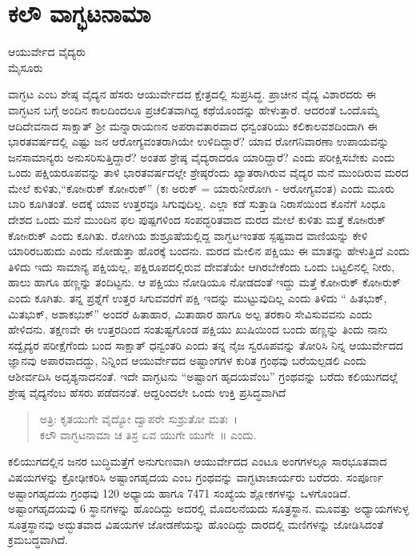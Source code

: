 {\fontsize{14}{16}\selectfont
{}
\chapter{ಕಲೌ ವಾಗ್ಭಟನಾಮಾ} 

\begin{center}
\smallskip

ಆಯುರ್ವೇದ ವೈದ್ಯರು\\
ಮೈಸೂರು
\addrule
\end{center}

ವಾಗ್ಭಟ ಎಂಬ ಶೇಷ್ಠ ವೈದ್ಯನ ಹೆಸರು ಆಯುರ್ವೇದದ ಕ್ಷೇತ್ರದಲ್ಲಿ ಸುಪ್ರಸಿದ್ಧ. ಪ್ರಾಚೀನ ವೈದ್ಯ ವಿಶಾರದರು ಈ ವಾಗ್ಭಟನ ಬಗ್ಗೆ ಅಂದಿನ ಕಾಲದಿಂದಲೂ ಪ್ರಚಲಿತವಾಗಿದ್ದ ಕಥೆಯೊಂದನ್ನು ಹೇಳುತ್ತಾರೆ. ಆದರಂತೆ ಒಂದೊಮ್ಮೆ ಆದಿದೇವನಾದ  ಸಾಕ್ಷಾತ್ ಶ್ರೀ ಮನ್ನಾರಾಯಣನ ಅಪರಾವತಾರವಾದ ಧನ್ವಂತರಿಯು ಕಲಿಕಾಲವಶದಿಂದಾಗಿ ಈ ಭಾರತವರ್ಷದಲ್ಲಿ ಎಷ್ಟು ಜನ ಆರೋಗ್ಯವಂತರಾಗಿಯೇ ಉಳಿದಿದ್ದಾರೆ? ಯಾವ ರೋಗನಿವಾರಣಾ ಉಪಾಯವನ್ನು ಜನಸಾಮಾನ್ಯರು ಅನುಸರಿಸುತ್ತಿದ್ದಾರೆ? ಅಂತಹ ಶ್ರೇಷ್ಠ ವೈದ್ಯರಾದರೂ ಯಾರಿದ್ದಾರೆ? ಎಂದು ಪರೀಕ್ಷಿಸಬೇಕು ಎಂದು ಒಂದು ಪಕ್ಷಿಯರೂಪವನ್ನು ತಾಳಿ ಭಾರತವರ್ಷದಲ್ಲೇ ಶ್ರೇಷ್ಠರೆಂದು ಖ್ಯಾತರಾಗಿರುವ ವೈದ್ಯರ ಮನೆ ಮುಂದಿರುವ ಮರದ ಮೇಲೆ ಕುಳಿತು,“ಕೋsರುಕ್ ಕೋsರುಕ್” (ಕಃ ಅರುಕ್ = ಯಾರು\break ನೀರೋಗಿ - ಆರೋಗ್ಯವಂತ) ಎಂದು ಮೂರು ಬಾರಿ ಕೂಗಿತಂತೆ. ಅದಕ್ಕೆ ಯಾವ ಉತ್ತರವೂ ಸಿಗುವುದಿಲ್ಲ. ಎಲ್ಲಾ ಕಡೆ ಸುತ್ತಾಡಿ ನಿರಾಸೆಯಿಂದ ಕೊನೆಗೆ ಸಿಂಧೂ ದೇಶದ ಒಂದು ಮನೆ ಮುಂದಿನ ಫಲ ಪುಷ್ಪಗಳಿಂದ ಸಂಪದ್ಭರಿತವಾದ ಮರದ ಮೇಲೆ ಕುಳಿತು ಮತ್ತೆ ಕೋsರುಕ್ ಕೋsರುಕ್ ಎಂದು ಕೂಗಿತು. ರೋಗಿಯ ಶುಶ್ರೂಷೆಯಲ್ಲಿದ್ದ ವಾಗ್ಭಟ\break ಇಂತಹ ಸ್ಪಷ್ಟವಾದ ವಾಣಿಯನ್ನು ಕೇಳಿ ಯಾರಿರಬಹುದು ಎಂದು ನೋಡುತ್ತಾ ಹೊರಕ್ಕೆ ಬಂದನು. ಮರದ ಮೇಲಿನ ಪಕ್ಷಿಯು ಈ ಮಾತನ್ನು ಹೇಳುತ್ತಿದೆ ಎಂದು ತಿಳಿದು ಇದು ಸಾಮಾನ್ಯ ಪಕ್ಷಿಯಲ್ಲ, ಪಕ್ಷಿರೂಪದಲ್ಲಿರುವ ದೇವತೆಯೇ ಆಗಿರಬೇಕೆಂದು ಒಂದು ಬಟ್ಟಲಿನಲ್ಲಿ ನೀರು, ಹಾಲು ಹಾಗೂ ಹಣ್ಣನ್ನು ತಂದಿಟ್ಟನು. ಆ ಪಕ್ಷಿಯು ನೋಡಿಯೂ ನೋಡದಂತೆ ಇದ್ದು ಮತ್ತೆ ಕೋsರುಕ್ ಕೋsರುಕ್ ಎಂದು ಕೂಗಿತು. ತನ್ನ ಪ್ರಶ್ನೆಗೆ ಉತ್ತರ ಸಿಗುವವರೆಗೆ ಪಕ್ಷಿ ಇದನ್ನು ಮುಟ್ಟುವುದಿಲ್ಲ ಎಂದು ತಿಳಿದು “ ಹಿತಭುಕ್, ಮಿತಭುಕ್, ಅಶಾಕಭುಕ್” ಅಂದರೆ ಹಿತಾಹಾರ, ಮಿತಾಹಾರ ಹಾಗೂ ಅಲ್ಪ ತರಕಾರಿ ಸೇವಿಸುವವನು ಎಂದು ಹೇಳಿದನು. ತಕ್ಷಣವೇ ಈ ಉತ್ತರದಿಂದ ಸಂತುಷ್ಟಗೊಂಡ ಪಕ್ಷಿಯು ಖುಷಿಯಿಂದ ಬಂದು ಹಣ್ಣನ್ನು ತಿಂದು ನಾನು ಸದ್ವೈದ್ಯರ ಪರೀಕ್ಷೆಗೆಂದು ಬಂದ ಸಾಕ್ಷಾತ್ ಧನ್ವಂತರಿ ಎಂದು ತನ್ನ ನೈಜ ಸ್ವರೂಪವನ್ನು ತೋರಿಸಿ ನಿನ್ನ ಆಯುರ್ವೇದದ ಜ್ಞಾನವು ಅಪಾರವಾದದ್ದು, ನಿನ್ನಿಂದ ಆಯುರ್ವೇದದ ಅಷ್ಟಾಂಗಗಳ ಕುರಿತ ಗ್ರಂಥವು ಬರೆಯಲ್ಪಡಲಿ ಎಂದು ಆಶೀರ್ವದಿಸಿ ಅದೃಶ್ಯನಾದನಂತೆ. ಇದೇ ವಾಗ್ಭಟನು “ಅಷ್ಟಾಂಗ ಹೃದಯವೆಂಬ” ಗ್ರಂಥವನ್ನು ಬರೆದು ಕಲಿಯುಗದಲ್ಲೆ ಶ್ರೇಷ್ಠ ವೈದ್ಯನೆಂಬ ಹೆಸರು ಪಡೆದನಂತೆ. ಆದ್ದರಿಂದಲೇ ಒಂದು ಉಕ್ತಿ ಪ್ರಸಿದ್ಧವಾಗಿದೆ 
\begin{verse}
ಅತ್ರಿ: ಕೃತಯುಗೇ ವೈದ್ಯೋ ದ್ವಾಪರೇ ಸುಶ್ರುತೋ ಮತಃ~। \\
ಕಲೌ ವಾಗ್ಭಟನಾಮಾ ಚ ತಿಸ್ರ ಏವ ಯುಗೇ ಯುಗೇ~॥ ಎಂದು.
\end{verse}
ಕಲಿಯುಗದಲ್ಲಿನ ಜನರ ಬುದ್ಧಿಮತ್ತೆಗೆ ಅನುಗುಣವಾಗಿ ಆಯುರ್ವೇದದ ಎಂಟೂ ಅಂಗಗಳಲ್ಲೂ ಸಾರಭೂತವಾದ ವಿಷಯಗಳನ್ನು ಕ್ರೋಢೀಕರಿಸಿ ಅಷ್ಟಾಂಗಹೃದಯ ಎಂಬ ಗ್ರಂಥವನ್ನು ವಾಗ್ಭಟಾಚಾರ್ಯರು ಬರೆದರು. ಸಂಪೂರ್ಣ ಅಷ್ಟಾಂಗ\-ಹೃದಯ ಗ್ರಂಥವು 120 ಅಧ್ಯಾಯ ಹಾಗೂ 7471 ಸಂಖ್ಯೆಯ ಶ್ಲೋಕಗಳನ್ನು ಒಳ\-ಗೊಂಡಿದೆ. ಅಷ್ಟಾಂಗಹೃದಯವು 6 ಸ್ಥಾನಗಳನ್ನು ಹೊಂದಿದ್ದು ಅದರಲ್ಲಿ ಮೊದಲನೆಯದು ಸೂತ್ರಸ್ಥಾನ. ಮೂವತ್ತು ಅಧ್ಯಾಯಗಳುಳ್ಳ ಸೂತ್ರಸ್ಥಾನವು ಅದ್ಭುತವಾದ ವಿಷಯ\-ಗಳ ಜೋಡಣೆ\-ಯನ್ನು ಹೊಂದಿದ್ದು ದಾರದಲ್ಲಿ ಮಣಿಗಳನ್ನು ಜೋಡಿಸಿದಂತೆ ಕ್ರಮಬದ್ಧ\-ವಾಗಿದೆ.

}
